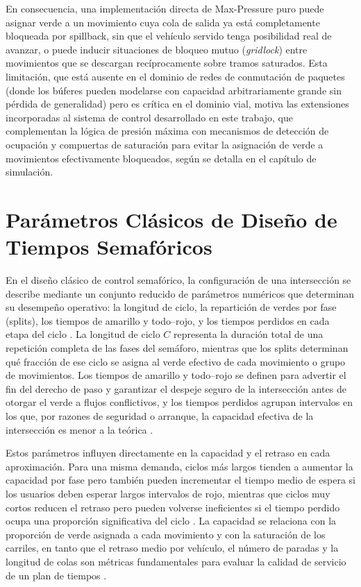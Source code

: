 En consecuencia, una implementación directa de Max-Pressure puro puede asignar verde a un movimiento cuya cola de salida ya está completamente bloqueada por spillback, sin que el vehículo servido tenga posibilidad real de avanzar, o puede inducir situaciones de bloqueo mutuo (\emph{gridlock}) entre movimientos que se descargan recíprocamente sobre tramos saturados. Esta limitación, que está ausente en el dominio de redes de conmutación de paquetes (donde los búferes pueden modelarse con capacidad arbitrariamente grande sin pérdida de generalidad) pero es crítica en el dominio vial, motiva las extensiones incorporadas al sistema de control desarrollado en este trabajo, que complementan la lógica de presión máxima con mecanismos de detección de ocupación y compuertas de saturación para evitar la asignación de verde a movimientos efectivamente bloqueados, según se detalla en el capítulo de simulación.




\section{Parámetros Clásicos de Diseño de Tiempos Semafóricos}
\label{subsec:parametros_diseno_tiempos}

En el diseño clásico de control semafórico, la configuración de una intersección se describe mediante un conjunto reducido de parámetros numéricos que determinan su desempeño operativo: la longitud de ciclo, la repartición de verdes por fase (splits), los tiempos de amarillo y todo–rojo, y los tiempos perdidos en cada etapa del ciclo \cite{garber2019traffic,roess2019traffic}. La longitud de ciclo $C$ representa la duración total de una repetición completa de las fases del semáforo, mientras que los splits determinan qué fracción de ese ciclo se asigna al verde efectivo de cada movimiento o grupo de movimientos. Los tiempos de amarillo y todo–rojo se definen para advertir el fin del derecho de paso y garantizar el despeje seguro de la intersección antes de otorgar el verde a flujos conflictivos, y los tiempos perdidos agrupan intervalos en los que, por razones de seguridad o arranque, la capacidad efectiva de la intersección es menor a la teórica \cite{garber2019traffic}.

Estos parámetros influyen directamente en la capacidad y el retraso en cada aproximación. Para una misma demanda, ciclos más largos tienden a aumentar la capacidad por fase pero también pueden incrementar el tiempo medio de espera si los usuarios deben esperar largos intervalos de rojo, mientras que ciclos muy cortos reducen el retraso pero pueden volverse ineficientes si el tiempo perdido ocupa una proporción significativa del ciclo \cite{roess2019traffic,papageorgiou2003review}. La capacidad se relaciona con la proporción de verde asignada a cada movimiento y con la saturación de los carriles, en tanto que el retraso medio por vehículo, el número de paradas y la longitud de colas son métricas fundamentales para evaluar la calidad de servicio de un plan de tiempos \cite{garber2019traffic,fhwa2008signal}.

